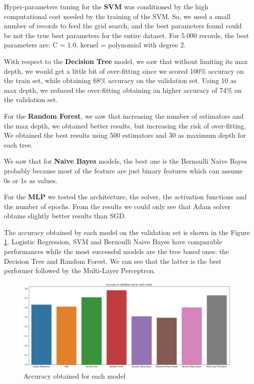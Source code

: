 \documentclass{article}
\begin{document}
Hyper-parameters tuning for the \textbf{SVM} was conditioned by the high computational cost needed by the training of the SVM. So, we used a small number of records to feed the grid search, and the best parameters found could be not the true best parameters for the entire dataset. For 5.000 records, the best parameters are: C = 1.0, kernel = polynomial with degree 2.

With respect to the \textbf{Decision Tree} model, we saw that without limiting its max depth, we would get a little bit of over-fitting since we scored 100\% accuracy on the train set, while obtaining 68\% accuracy on the validation set. Using 10 as max depth, we reduced the over-fitting obtaining an higher accuracy of 74\% on the validation set.

For the \textbf{Random Forest}, we saw that increasing the number of estimators and the max depth, we obtained better results, but increasing the risk of over-fitting. We obtained the best results using 500 estimators and 30 as maximum depth for each tree.

We saw that for \textbf{Naive Bayes} models, the best one is the Bernoulli Naive Bayes probably because most of the feature are just binary features which can assume 0s or 1s as values.

For the \textbf{MLP} we tested the architecture, the solver, the activation functions and the number of epochs. From the results we could only see that Adam solver obtains slightly better results than SGD.

The accuracy obtained by each model on the validation set is shown in the Figure \ref{img:accuracy}. Logistic Regression, SVM and Bernoulli Naive Bayes have comparable performances while the most successful models are the tree based ones: the Decision Tree and Random Forest. We can see that the latter is the best performer followed by the Multi-Layer Perceptron.

\begin{figure}[h!]
\centering
\includegraphics[width=\textwidth]{accuracy-valset}
\caption{Accuracy obtained for each model}
\label{img:accuracy}
\end{figure}
\end{document}
